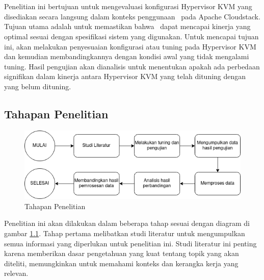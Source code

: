 \chapter{\babTiga}
Penelitian ini bertujuan untuk mengevaluasi konfigurasi Hypervisor KVM yang disediakan secara langsung dalam konteks penggunaan \vm\ pada Apache Cloudstack. Tujuan utama adalah untuk memastikan bahwa \vm\ dapat mencapai kinerja yang optimal sesuai dengan spesifikasi sistem yang digunakan. Untuk mencapai tujuan ini, \saya akan melakukan penyesuaian konfigurasi atau tuning pada Hypervisor KVM dan kemudian membandingkannya dengan kondisi awal yang tidak mengalami tuning. Hasil pengujian akan dianalisis untuk menentukan apakah ada perbedaan signifikan dalam kinerja antara Hypervisor KVM yang telah dituning dengan yang belum dituning.

\section{Tahapan Penelitian}
\begin{figure}
    \centering
    \includegraphics[width=1\textwidth]
    {assets/pics/tahapan-penelitian.png}
    \caption{Tahapan Penelitian}
    \label{fig:TahapanPenelitian}
\end{figure}

Penelitian ini akan dilakukan dalam beberapa tahap sesuai dengan diagram di gambar \ref{fig:TahapanPenelitian}. Tahap pertama melibatkan studi literatur untuk mengumpulkan semua informasi yang diperlukan untuk penelitian ini. Studi literatur ini penting karena memberikan dasar pengetahuan yang kuat tentang topik yang akan diteliti, memungkinkan \saya untuk memahami konteks dan kerangka kerja yang relevan.

